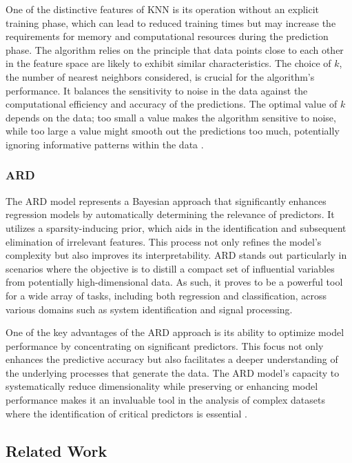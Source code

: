 \documentclass{article} %
\begin{document}
One of the distinctive features of \gls*{KNN} is its operation without an explicit training phase, which can lead to reduced training times but may increase the requirements for memory and computational resources during the prediction phase. The algorithm relies on the principle that data points close to each other in the feature space are likely to exhibit similar characteristics. The choice of \(k\), the number of nearest neighbors considered, is crucial for the algorithm's performance. It balances the sensitivity to noise in the data against the computational efficiency and accuracy of the predictions. The optimal value of \(k\) depends on the data; too small a value makes the algorithm sensitive to noise, while too large a value might smooth out the predictions too much, potentially ignoring informative patterns within the data \cite{cover1967nearest}.


\subsubsection{ARD}
The \gls*{ARD} model represents a Bayesian approach that significantly enhances regression models by automatically determining the relevance of predictors. It utilizes a sparsity-inducing prior, which aids in the identification and subsequent elimination of irrelevant features. This process not only refines the model's complexity but also improves its interpretability. \gls*{ARD} stands out particularly in scenarios where the objective is to distill a compact set of influential variables from potentially high-dimensional data. As such, it proves to be a powerful tool for a wide array of tasks, including both regression and classification, across various domains such as system identification and signal processing.

One of the key advantages of the \gls*{ARD} approach is its ability to optimize model performance by concentrating on significant predictors. This focus not only enhances the predictive accuracy but also facilitates a deeper understanding of the underlying processes that generate the data. The \gls*{ARD} model's capacity to systematically reduce dimensionality while preserving or enhancing model performance makes it an invaluable tool in the analysis of complex datasets where the identification of critical predictors is essential \cite{qi2004predictive, rudy2021sparse}.


\subsection{Related Work}
\end{document}
